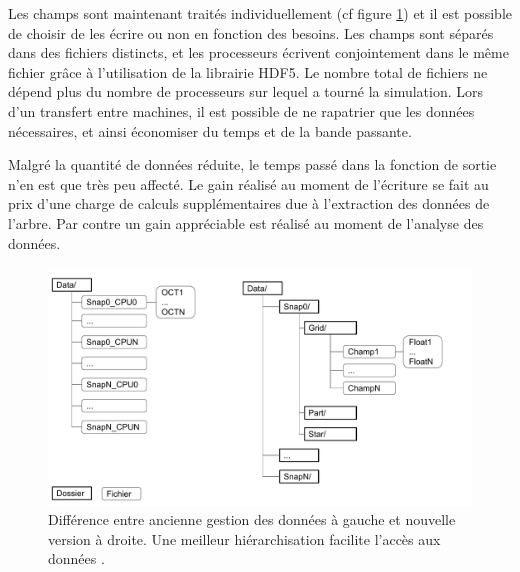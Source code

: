Les champs sont maintenant traités individuellement (cf figure \ref{fig:data}) et il est possible de choisir de les écrire ou non en fonction des besoins.
Les champs sont séparés dans des fichiers distincts, et les processeurs écrivent conjointement dans le même fichier grâce à l'utilisation de la librairie HDF5.
Le nombre total de fichiers ne dépend plus du nombre de processeurs sur lequel a tourné la simulation.
Lors d'un transfert entre machines, il est possible de ne rapatrier que les données nécessaires, et ainsi économiser du temps et de la bande passante.

Malgré la quantité de données réduite, le temps passé dans la fonction de sortie n'en est que très peu affecté.
Le gain réalisé au moment de l'écriture se fait au prix d'une charge de calculs supplémentaires due à l'extraction des données de l'arbre.
Par contre un gain appréciable est réalisé au moment de l'analyse des données.

\begin{figure}
        \includegraphics[width=.95\linewidth]{img/02/data.pdf} 
        \caption[Gestion des IO]{Différence entre ancienne gestion des données à gauche et nouvelle version à droite.
        Une meilleur hiérarchisation facilite l'accès aux données .
 		\label{fig:data}
 		}
\end{figure}





%


